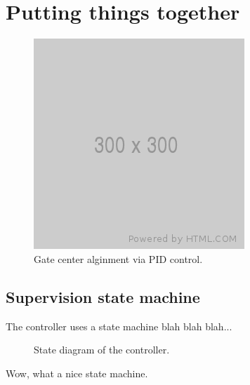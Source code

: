 \section{Putting things together}

\begin{figure}[h]
	\centering
	\includegraphics[width=\textwidth]{figure/300x300.png}
	\caption{Gate center alginment via PID control.}
\end{figure}

\subsection{Supervision state machine}

The controller uses a state machine blah blah blah...

\begin{figure}[h]
	\centering
	
	\caption{State diagram of the controller.}
\end{figure}

Wow, what a nice state machine.
